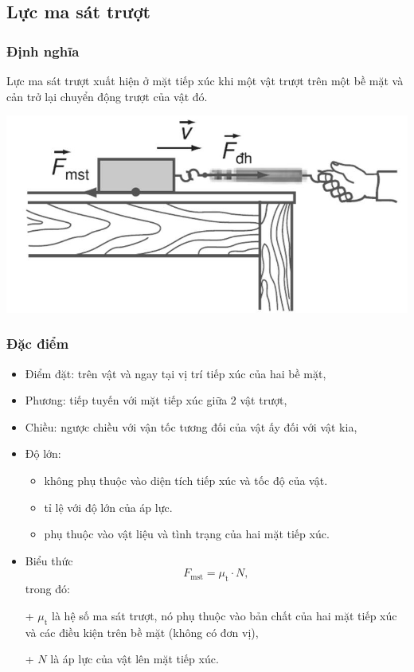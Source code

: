\subsection{Lực ma sát trượt}
\subsubsection{Định nghĩa}
Lực ma sát trượt xuất hiện ở mặt tiếp xúc khi một vật trượt trên một bề mặt và cản trở lại chuyển động trượt của vật đó.
\begin{center}
	\includegraphics[scale=0.35]{../figs/VN10-PH-15-L-012-1-V2-01.JPG}
\end{center}
\subsubsection{Đặc điểm}
\begin{itemize}
	\item Điểm đặt: trên vật và ngay tại vị trí tiếp xúc của hai bề mặt,
	\item Phương: tiếp tuyến với mặt tiếp xúc giữa 2 vật trượt,
	\item Chiều: ngược chiều với vận tốc tương đối của vật ấy đối với vật kia,
	\item Độ lớn:
	\begin{itemize}
		\item không phụ thuộc vào diện tích tiếp xúc và tốc độ của vật.
		\item tỉ lệ với độ lớn của áp lực.
		\item phụ thuộc vào vật liệu và tình trạng của hai mặt tiếp xúc.
	\end{itemize}
	\item Biểu thức 
	\begin{equation*}
		F_{\text{mst}} = \mu_{\text{t}} \cdot N,
	\end{equation*}
	trong đó:
	
	+ $\mu_{\text{t}}$ là hệ số ma sát trượt, nó phụ thuộc vào bản chất của hai mặt tiếp xúc và các điều kiện trên bề mặt (không có đơn vị),
	
	+ $N$ là áp lực của vật lên mặt tiếp xúc.
\end{itemize}
